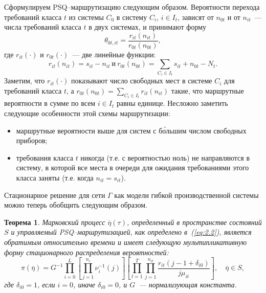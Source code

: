 \documentclass[a4paper,14pt]{extarticle}
\theoremstyle{note}
\newtheorem{theorem}{Теорема}
\begin{document}
Сформулируем PSQ--маршрутизацию следующим образом. Вероятности перехода требований класса $t$ из системы $C_0$ в систему $C_i$, $i \in I_t$, зависят от $n_{0t}$ и от $n_{it}$~--- числа требований класса $t$ в двух системах, и принимают форму
\begin{equation}
 \theta_{0t,it} = \frac{r_{it}(n_{it})} {r_{0t}(n_{0t})},
\label{eq:2.2}
\end{equation}
где $r_{it}(\cdot)$ и $r_{0t}(\cdot)$~--- две линейные функции:
\begin{equation*}
 r_{it}(n_{it}) = s_{it} - n_{it} ~ \text{и} ~ r_{0t}(n_{0t}) = \sum_{C_i \in I_t} s_{it} + n_{0t} - N_t .
\end{equation*}
Заметим, что $r_{it}(\cdot)$ показывают число свободных мест в системе $C_i$ для требований класса $t$, а $r_{0t}(n_{0t}) = \sum\limits_{C_i \in I_t} r_{it}(n_{it})$ такие, что маршрутные вероятности в сумме по всем $i \in I_t$ равны единице. Несложно заметить следующие особенности этой схемы маршрутизации:
\begin{itemize}
\item маршрутные вероятности выше для систем с б\'{о}льшим числом свободных приборов;
\item требования класса $t$ никогда (т.е. с вероятностью ноль) не направляются в систему, в которой все места в очереди для ожидания требованиями этого класса заняты (т.е. когда $n_{it} = s_{it}$).
\end{itemize}

Стационарное решение для сети $\Gamma$ как модели гибкой производственной системы можно теперь обобщить следующим образом.

\begin{theorem}
 Марковский процесс $\overline{\eta}(\tau)$, определенный в пространстве состояний $S$ и управляемый PSQ--маршрутизацией, как определено в~(\ref{eq:2.2}), является обратимым относительно времени и имеет следующую мультипликативную форму стационарного распределения вероятностей:
 \begin{equation}
  \pi(\overline{\eta}) = G^{-1} \prod_{i=0}^L \left[ \prod_{j=1}^{n_i} \nu_i^{-1} (j) \right]
  \left[ \prod_{t=1}^T \prod_{j=1}^{n_{it}} \frac{r_{it} (j - 1 + \delta_{i0})}{j\mu_{it}} \right], \quad \overline{\eta} \in S ,
  \label{eq:2.4}
 \end{equation}
где $\delta_{i0}=1$, если $i=0$, иначе $\delta_{i0}=0$, и $G$~--- нормализующая константа.
\end{theorem}


\end{document}
